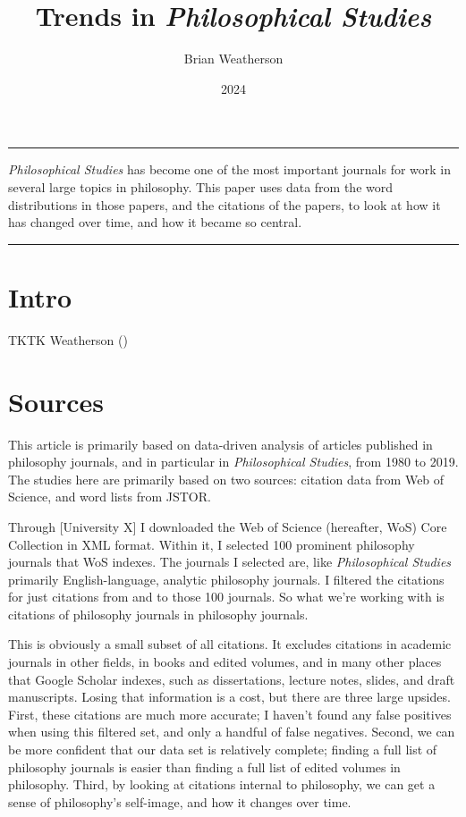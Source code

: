 \documentclass[
  10pt,
  letterpaper,
  DIV=11,
  numbers=noendperiod,
  twoside]{scrartcl}
\title{Trends in \emph{Philosophical Studies}}
\author{Brian Weatherson}
\date{2024}
\renewenvironment{abstract}
 {\vspace{-1.25cm}
 \quotation\small\noindent\rule{\linewidth}{.5pt}\par\smallskip
 \noindent }
 {\par\noindent\rule{\linewidth}{.5pt}\endquotation}
\begin{document}
\maketitle
\begin{abstract}
\emph{Philosophical Studies} has become one of the most important
journals for work in several large topics in philosophy. This paper uses
data from the word distributions in those papers, and the citations of
the papers, to look at how it has changed over time, and how it became
so central.
\end{abstract}


\section{Intro}\label{intro}

TKTK Weatherson ()

\section{Sources}\label{sec-sources}

This article is primarily based on data-driven analysis of articles
published in philosophy journals, and in particular in
\emph{Philosophical Studies}, from 1980 to 2019. The studies here are
primarily based on two sources: citation data from Web of Science, and
word lists from JSTOR.

Through {[}University X{]} I downloaded the Web of Science (hereafter,
WoS) Core Collection in XML format. Within it, I selected 100 prominent
philosophy journals that WoS indexes. The journals I selected are, like
\emph{Philosophical Studies} primarily English-language, analytic
philosophy journals. I filtered the citations for just citations from
and to those 100 journals. So what we're working with is citations of
philosophy journals in philosophy journals.

This is obviously a small subset of all citations. It excludes citations
in academic journals in other fields, in books and edited volumes, and
in many other places that Google Scholar indexes, such as dissertations,
lecture notes, slides, and draft manuscripts. Losing that information is
a cost, but there are three large upsides. First, these citations are
much more accurate; I haven't found any false positives when using this
filtered set, and only a handful of false negatives. Second, we can be
more confident that our data set is relatively complete; finding a full
list of philosophy journals is easier than finding a full list of edited
volumes in philosophy. Third, by looking at citations internal to
philosophy, we can get a sense of philosophy's self-image, and how it
changes over time.
\end{document}
